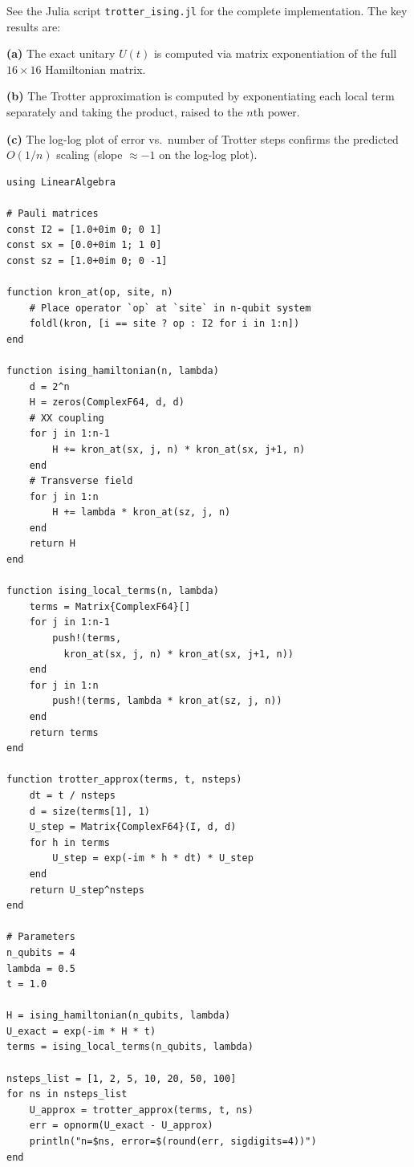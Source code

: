 \documentclass[12pt,oneside]{amsart}
\begin{document}
\begin{exercise}
\end{exercise}
\begin{solution}
  See the Julia script \texttt{trotter\_ising.jl} for the complete
  implementation.  The key results are:

  \textbf{(a)} The exact unitary $U(t)$ is computed via matrix
  exponentiation of the full $16\times 16$ Hamiltonian matrix.

  \textbf{(b)} The Trotter approximation is computed by exponentiating each
  local term separately and taking the product, raised to the $n$th power.

  \textbf{(c)} The log-log plot of error vs.\ number of Trotter steps
  confirms the predicted $O(1/n)$ scaling (slope $\approx -1$ on the
  log-log plot).

  \begin{lstlisting}[caption={trotter\_ising.jl --- Trotter error analysis}]
using LinearAlgebra

# Pauli matrices
const I2 = [1.0+0im 0; 0 1]
const sx = [0.0+0im 1; 1 0]
const sz = [1.0+0im 0; 0 -1]

function kron_at(op, site, n)
    # Place operator `op` at `site` in n-qubit system
    foldl(kron, [i == site ? op : I2 for i in 1:n])
end

function ising_hamiltonian(n, lambda)
    d = 2^n
    H = zeros(ComplexF64, d, d)
    # XX coupling
    for j in 1:n-1
        H += kron_at(sx, j, n) * kron_at(sx, j+1, n)
    end
    # Transverse field
    for j in 1:n
        H += lambda * kron_at(sz, j, n)
    end
    return H
end

function ising_local_terms(n, lambda)
    terms = Matrix{ComplexF64}[]
    for j in 1:n-1
        push!(terms,
          kron_at(sx, j, n) * kron_at(sx, j+1, n))
    end
    for j in 1:n
        push!(terms, lambda * kron_at(sz, j, n))
    end
    return terms
end

function trotter_approx(terms, t, nsteps)
    dt = t / nsteps
    d = size(terms[1], 1)
    U_step = Matrix{ComplexF64}(I, d, d)
    for h in terms
        U_step = exp(-im * h * dt) * U_step
    end
    return U_step^nsteps
end

# Parameters
n_qubits = 4
lambda = 0.5
t = 1.0

H = ising_hamiltonian(n_qubits, lambda)
U_exact = exp(-im * H * t)
terms = ising_local_terms(n_qubits, lambda)

nsteps_list = [1, 2, 5, 10, 20, 50, 100]
for ns in nsteps_list
    U_approx = trotter_approx(terms, t, ns)
    err = opnorm(U_exact - U_approx)
    println("n=$ns, error=$(round(err, sigdigits=4))")
end
  \end{lstlisting}


\end{solution}
\end{document}
